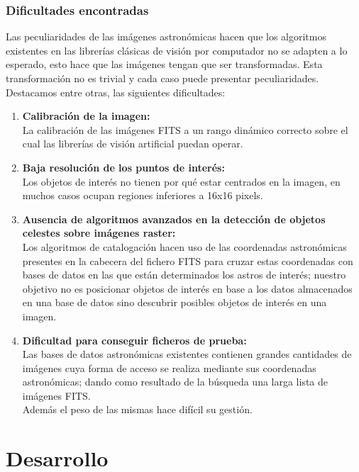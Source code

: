 	\subsubsection{Dificultades encontradas}
	Las peculiaridades de las imágenes astronómicas hacen que los algoritmos existentes en las librerías clásicas de visión por computador no se adapten a lo esperado, esto hace que las imágenes tengan que ser transformadas. Esta transformación no es trivial y cada caso puede presentar peculiaridades.
	\newline
	\\
	Destacamos entre otras, las siguientes dificultades:
	\begin{enumerate}
	\item \textbf{Calibración de la imagen:}\\
	La calibración de las imágenes FITS a un rango dinámico correcto sobre el cual las librerías de visión artificial puedan operar.
	\item \textbf{Baja resolución de los puntos de interés:}\\
	Los objetos de interés no tienen por qué estar centrados en la imagen, en muchos casos ocupan regiones inferiores a 16x16 pixels. 
	\item \textbf{Ausencia de algoritmos avanzados en la detección de objetos celestes sobre imágenes raster:}\\
	Los algoritmos de catalogación hacen uso de las coordenadas astronómicas presentes en la cabecera del fichero FITS para cruzar estas coordenadas con bases de datos en las que están determinados los astros de interés; nuestro objetivo no es posicionar objetos de interés en base a los datos almacenados en una base de datos sino descubrir posibles objetos de interés en una imagen.
	\item \textbf{Dificultad para conseguir ficheros de prueba:} \\
	Las bases de datos astronómicas existentes contienen grandes cantidades de imágenes cuya forma de acceso se realiza mediante sus coordenadas astronómicas; dando como resultado de la búsqueda una larga lista de imágenes FITS.\\Además el peso de las mismas hace difícil su gestión.
	\end{enumerate}
	\newpage
	\section{Desarrollo}
